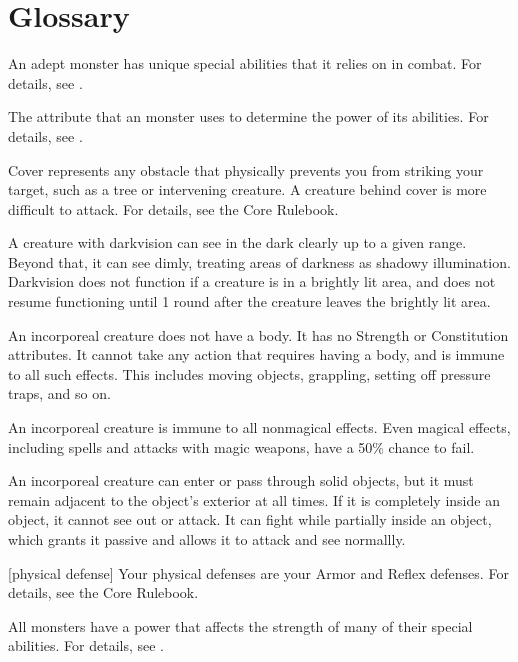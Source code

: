 \chapter{Glossary}\label{Glossary}

 An adept monster has unique special abilities that it relies on in combat.
For details, see .

 The attribute that an  monster uses to determine the power of its abilities.
For details, see .

 Cover represents any obstacle that physically prevents you from striking your target, such as a tree or intervening creature. A creature behind cover is more difficult to attack.
For details, see the Core Rulebook.

 A creature with darkvision can see in the dark clearly up to a given range.
Beyond that, it can see dimly, treating areas of darkness as shadowy illumination.
Darkvision does not function if a creature is in a brightly lit area, and does not resume functioning until 1 round after the creature leaves the brightly lit area.

 An incorporeal creature does not have a body.
It has no Strength or Constitution attributes.
It cannot take any action that requires having a body, and is immune to all such effects.
This includes moving objects, grappling, setting off pressure traps, and so on.

An incorporeal creature is immune to all nonmagical effects.
Even magical effects, including spells and attacks with magic weapons, have a 50\% chance to fail.

An incorporeal creature can enter or pass through solid objects, but it must remain adjacent to the object's exterior at all times.
If it is completely inside an object, it cannot see out or attack.
It can fight while partially inside an object, which grants it passive  and allows it to attack and see normallly.

[physical defense] Your physical defenses are your Armor and Reflex defenses.
For details, see the Core Rulebook.

 All monsters have a power that affects the strength of many of their special abilities.
For details, see .
